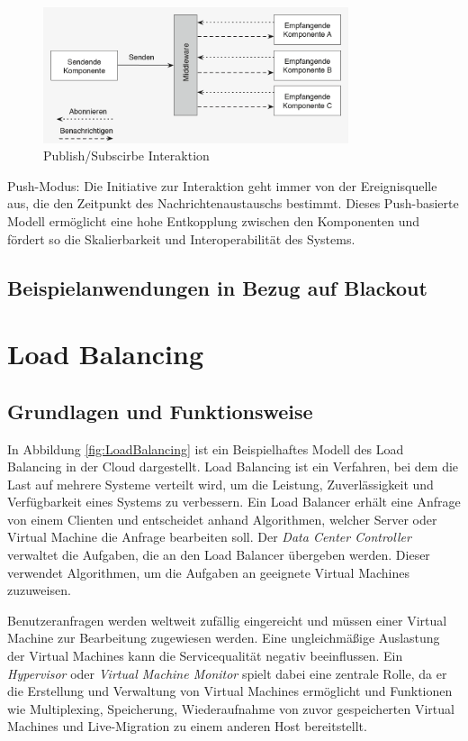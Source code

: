 \documentclass[a4paper,12pt]{article}
\let\stdsection\section
\renewcommand\section{\newpage\stdsection}
\begin{document}
\begin{figure}[h]
    \centering
    \includegraphics[width=0.8\textwidth]{images/Publish_Subscirbe.png}
    \caption{Publish/Subscirbe Interaktion \cite[S. 54]{Bruns2010}}
    \label{fig:PubSub}
\end{figure}
Push-Modus: Die Initiative zur Interaktion geht immer von der Ereignisquelle aus, die den Zeitpunkt des Nachrichtenaustauschs bestimmt. Dieses Push-basierte Modell ermöglicht eine hohe Entkopplung zwischen den Komponenten und fördert so die Skalierbarkeit und Interoperabilität des Systems. \cite [S. 53f]{Bruns2010}
\subsection{Beispielanwendungen in Bezug auf Blackout}
 \cite{example2023}

\section{Load Balancing}
\subsection{Grundlagen und Funktionsweise}
In Abbildung \ref{fig:LoadBalancing} ist ein Beispielhaftes Modell des Load Balancing in der Cloud dargestellt. Load Balancing ist ein Verfahren, bei dem die Last auf mehrere Systeme verteilt wird, um die Leistung, Zuverlässigkeit und Verfügbarkeit eines Systems zu verbessern.
Ein Load Balancer erhält eine Anfrage von einem Clienten und entscheidet anhand Algorithmen, welcher Server oder Virtual Machine die Anfrage bearbeiten soll. 
Der \textit{Data Center Controller} verwaltet die Aufgaben, die an den Load Balancer übergeben werden. Dieser verwendet Algorithmen, um die Aufgaben an geeignete Virtual Machines zuzuweisen.

Benutzeranfragen werden weltweit zufällig eingereicht und müssen einer Virtual Machine zur Bearbeitung zugewiesen werden. Eine ungleichmäßige Auslastung der Virtual Machines kann die Servicequalität negativ beeinflussen. Ein \textit{Hypervisor} oder \textit{Virtual Machine Monitor} spielt dabei eine zentrale Rolle, da er die Erstellung und Verwaltung von Virtual Machines ermöglicht und Funktionen wie Multiplexing, Speicherung, Wiederaufnahme von zuvor gespeicherten Virtual Machines und Live-Migration zu einem anderen Host bereitstellt. \cite[S. 2]{LoadBalancing}
\end{document}
